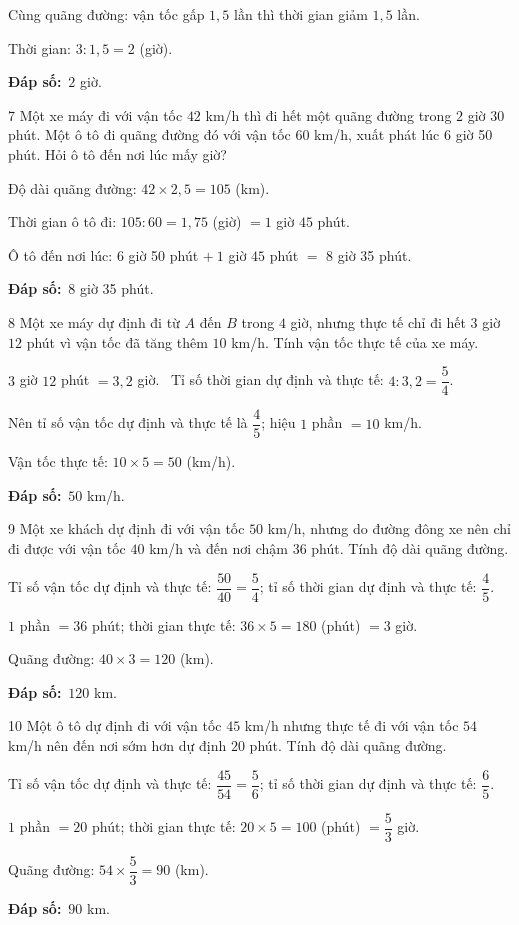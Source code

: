 \documentclass[11pt]{article}
\newif\ifsol \solfalse
\providecommand{\AnsWord}{Đáp số}
\newcommand{\dapso}[1]{\par\textbf{\AnsWord:}\ #1}
\newcommand{\probsol}[1]{%
  \begin{lrbox}{\solmeasure}\begin{minipage}{\dimexpr\linewidth-24pt\relax}#1\end{minipage}\end{lrbox}%
  \ifsol
    \begin{solbox}#1\end{solbox}%
  \else
    \setlength{\solht}{\dimexpr\ht\solmeasure+\dp\solmeasure+0.85cm\relax}%
    \ifdim\solht<1.35cm\setlength{\solht}{1.35cm}\fi
    \begin{tcolorbox}[colback=white,colframe=Line,boxrule=0.8pt,arc=5pt,
      left=8pt,right=8pt,top=4pt,bottom=4pt,height=\solht]{\footnotesize\color{Slate}\itshape\WorkWord}\end{tcolorbox}%
  \fi}
\newcommand{\gap}{\vspace{0.3cm}}
\def\WorkWord{Bài làm:}
\def\AnsWord{Đáp số}
\begin{document}
\probsol{
Cùng quãng đường: vận tốc gấp $1{,}5$ lần thì thời gian giảm $1{,}5$ lần.\par Thời gian: $3:1{,}5=2$ (giờ).
\dapso{$2$ giờ.}}
\gap
\begin{probbox}{7}{\relax}
Một xe máy đi với vận tốc $42$ km/h thì đi hết một quãng đường trong $2$ giờ $30$ phút. Một ô tô đi quãng đường đó với vận tốc $60$ km/h, xuất phát lúc 6 giờ 50 phút. Hỏi ô tô đến nơi lúc mấy giờ?
\end{probbox}
\probsol{
Độ dài quãng đường: $42\times2{,}5=105$ (km).\par Thời gian ô tô đi: $105:60=1{,}75$ (giờ) $=1$ giờ $45$ phút.\par Ô tô đến nơi lúc: 6 giờ 50 phút $+\ 1$ giờ $45$ phút $=$ 8 giờ 35 phút.
\dapso{8 giờ 35 phút.}}
\gap
\begin{probbox}{8}{\relax}
Một xe máy dự định đi từ $A$ đến $B$ trong $4$ giờ, nhưng thực tế chỉ đi hết $3$ giờ $12$ phút vì vận tốc đã tăng thêm $10$ km/h. Tính vận tốc thực tế của xe máy.
\end{probbox}
\probsol{
$3$ giờ $12$ phút $=3{,}2$ giờ. \ Tỉ số thời gian dự định và thực tế: $4:3{,}2=\dfrac54$.\par
Nên tỉ số vận tốc dự định và thực tế là $\dfrac45$; hiệu $1$ phần $=10$ km/h.\par Vận tốc thực tế: $10\times5=50$ (km/h).
\dapso{$50$ km/h.}}
\gap
\begin{probbox}{9}{\relax}
Một xe khách dự định đi với vận tốc $50$ km/h, nhưng do đường đông xe nên chỉ đi được với vận tốc $40$ km/h và đến nơi chậm $36$ phút. Tính độ dài quãng đường.
\end{probbox}
\probsol{
Tỉ số vận tốc dự định và thực tế: $\dfrac{50}{40}=\dfrac54$; tỉ số thời gian dự định và thực tế: $\dfrac45$.\par
$1$ phần $=36$ phút; thời gian thực tế: $36\times5=180$ (phút) $=3$ giờ.\par Quãng đường: $40\times3=120$ (km).
\dapso{$120$ km.}}
\gap
\begin{probbox}{10}{\relax}
Một ô tô dự định đi với vận tốc $45$ km/h nhưng thực tế đi với vận tốc $54$ km/h nên đến nơi sớm hơn dự định $20$ phút. Tính độ dài quãng đường.
\end{probbox}
\probsol{
Tỉ số vận tốc dự định và thực tế: $\dfrac{45}{54}=\dfrac56$; tỉ số thời gian dự định và thực tế: $\dfrac65$.\par
$1$ phần $=20$ phút; thời gian thực tế: $20\times5=100$ (phút) $=\dfrac53$ giờ.\par Quãng đường: $54\times\dfrac53=90$ (km).
\dapso{$90$ km.}}
\end{document}
